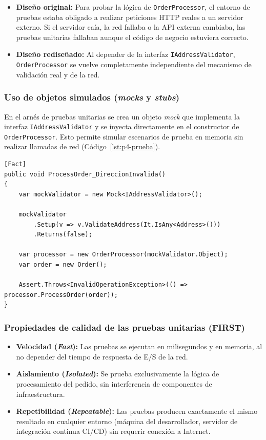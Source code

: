 \begin{itemize}
    \item \textbf{Diseño original:} Para probar la lógica de \texttt{OrderProcessor}, el entorno de pruebas estaba obligado a realizar peticiones HTTP reales a un servidor externo. Si el servidor caía, la red fallaba o la API externa cambiaba, las pruebas unitarias fallaban aunque el código de negocio estuviera correcto.
    \item \textbf{Diseño rediseñado:} Al depender de la interfaz \texttt{IAddressValidator}, \texttt{OrderProcessor} se vuelve completamente independiente del mecanismo de validación real y de la red.
\end{itemize}

\subsubsection*{Uso de objetos simulados (\emph{mocks} y \emph{stubs})}

En el arnés de pruebas unitarias se crea un objeto \emph{mock} que implementa la interfaz \texttt{IAddressValidator} y se inyecta directamente en el constructor de \texttt{OrderProcessor}. Esto permite simular escenarios de prueba en memoria sin realizar llamadas de red (Código~\ref{lst:p4-prueba}).

\begin{lstlisting}[caption={Prueba unitaria de \texttt{OrderProcessor} con un objeto simulado}, label=lst:p4-prueba]
[Fact]
public void ProcessOrder_DireccionInvalida()
{
    var mockValidator = new Mock<IAddressValidator>();

    mockValidator
        .Setup(v => v.ValidateAddress(It.IsAny<Address>()))
        .Returns(false);

    var processor = new OrderProcessor(mockValidator.Object);
    var order = new Order();

    Assert.Throws<InvalidOperationException>(() => processor.ProcessOrder(order));
}
\end{lstlisting}

\subsubsection*{Propiedades de calidad de las pruebas unitarias (FIRST)}

\begin{itemize}
    \item \textbf{Velocidad (\emph{Fast}):} Las pruebas se ejecutan en milisegundos y en memoria, al no depender del tiempo de respuesta de E/S de la red.
    \item \textbf{Aislamiento (\emph{Isolated}):} Se prueba exclusivamente la lógica de procesamiento del pedido, sin interferencia de componentes de infraestructura.
    \item \textbf{Repetibilidad (\emph{Repeatable}):} Las pruebas producen exactamente el mismo resultado en cualquier entorno (máquina del desarrollador, servidor de integración continua CI/CD) sin requerir conexión a Internet.
\end{itemize}

